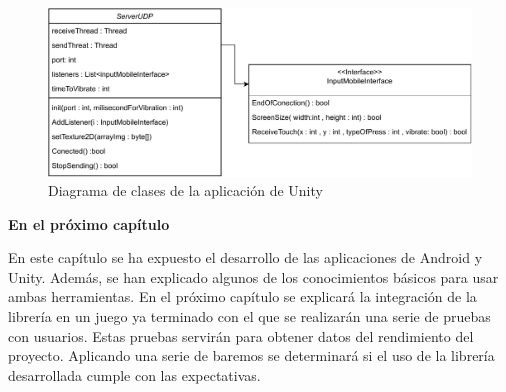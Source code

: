 \begin{figure}[h]

\centering
\includegraphics[width=1.0\textwidth]{./Imagenes/Vectorial/Arquitectura Unity.pdf}
\caption{Diagrama de clases de la aplicaci\'on de Unity}
\end{figure}

\vspace{10mm}

\bigskip
\Large{\textbf{En el pr\'oximo cap\'itulo}}\\
\normalsize

En este cap\'itulo se ha expuesto el desarrollo de las aplicaciones de Android y Unity. Adem\'as, se han explicado algunos de los conocimientos b\'asicos para usar ambas herramientas. En el pr\'oximo cap\'itulo se explicar\'a la integraci\'on de la librer\'ia en un juego ya terminado con el que se realizar\'an una serie de pruebas con usuarios. Estas pruebas servir\'an para obtener datos del rendimiento del proyecto. Aplicando una serie de baremos se determinar\'a si el uso de la librer\'ia desarrollada cumple con las expectativas.\\

